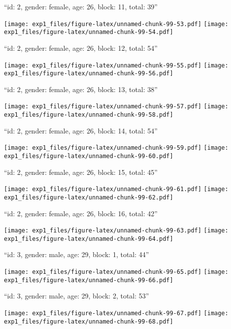 \documentclass[,]{article}
\begin{document}
\newpage
[1] 

``id: 2, gender: female, age: 26, block: 11, total: 39''

\texttt{[image: exp1\_files/figure-latex/unnamed-chunk-99-53.pdf]}
\texttt{[image: exp1\_files/figure-latex/unnamed-chunk-99-54.pdf]}

\newpage
[1] 

``id: 2, gender: female, age: 26, block: 12, total: 54''

\texttt{[image: exp1\_files/figure-latex/unnamed-chunk-99-55.pdf]}
\texttt{[image: exp1\_files/figure-latex/unnamed-chunk-99-56.pdf]}

\newpage
[1] 

``id: 2, gender: female, age: 26, block: 13, total: 38''

\texttt{[image: exp1\_files/figure-latex/unnamed-chunk-99-57.pdf]}
\texttt{[image: exp1\_files/figure-latex/unnamed-chunk-99-58.pdf]}

\newpage
[1] 

``id: 2, gender: female, age: 26, block: 14, total: 54''

\texttt{[image: exp1\_files/figure-latex/unnamed-chunk-99-59.pdf]}
\texttt{[image: exp1\_files/figure-latex/unnamed-chunk-99-60.pdf]}

\newpage
[1] 

``id: 2, gender: female, age: 26, block: 15, total: 45''

\texttt{[image: exp1\_files/figure-latex/unnamed-chunk-99-61.pdf]}
\texttt{[image: exp1\_files/figure-latex/unnamed-chunk-99-62.pdf]}

\newpage
[1] 

``id: 2, gender: female, age: 26, block: 16, total: 42''

\texttt{[image: exp1\_files/figure-latex/unnamed-chunk-99-63.pdf]}
\texttt{[image: exp1\_files/figure-latex/unnamed-chunk-99-64.pdf]}

\newpage
[1] 

``id: 3, gender: male, age: 29, block: 1, total: 44''

\texttt{[image: exp1\_files/figure-latex/unnamed-chunk-99-65.pdf]}
\texttt{[image: exp1\_files/figure-latex/unnamed-chunk-99-66.pdf]}

\newpage
[1] 

``id: 3, gender: male, age: 29, block: 2, total: 53''

\texttt{[image: exp1\_files/figure-latex/unnamed-chunk-99-67.pdf]}
\texttt{[image: exp1\_files/figure-latex/unnamed-chunk-99-68.pdf]}
\end{document}
